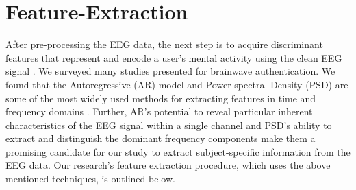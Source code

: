\section{\large Feature-Extraction}
\label{sec:Framework:Feature-Extraction}
After pre-processing the EEG data, the next step is to acquire discriminant features that represent and encode a user's mental activity using the clean EEG signal \cite{survey_brain_biometrics}. We surveyed many studies presented for brainwave authentication. We found
that the Autoregressive (AR) model and Power spectral Density (PSD) are some of the most widely used methods for extracting features in time and frequency domains \cite{arias2023performance, arias2021inexpensive}. Further, AR's potential to reveal particular inherent characteristics of the EEG signal within a single channel and PSD's ability to extract and distinguish the dominant frequency components \cite{survey_brain_biometrics} make them a promising candidate for our study to extract subject-specific information from the EEG data. Our research's feature extraction procedure, which uses the above mentioned techniques, is outlined below.  

